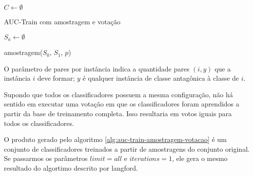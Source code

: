 \begin{algorithm}

    $C \gets \emptyset$



    \caption{AUC-Train com amostragem e votação}
    \label{alg:auc-train-amostragem-votacao}
\end{algorithm}

\begin{function}

    $S_a \gets \emptyset$\;
    
    


    \caption{amostragem($S_0$, $S_1$, $p$)}
    \label{func:amostra}
\end{function}

O parâmetro de pares por instância indica a quantidade pares $(i, y)$ que a instância $i$ deve formar; $y$ é qualquer instância de classe antagônica à classe de $i$.

Supondo que todos os classificadores possuem a mesma configuração, não há sentido em executar uma votação em que os classificadores foram aprendidos a partir da base de treinamento completa. Isso resultaria em votos iguais para todos os classificadores.

O produto gerado pelo algoritmo \ref{alg:auc-train-amostragem-votacao} é um conjunto de classificadores treinados a partir de amostragens do conjunto original. Se passarmos os parâmetros $limit=all$ e $iterations=1$, ele gera o mesmo resultado do algortimo descrito por {{langford}}.

